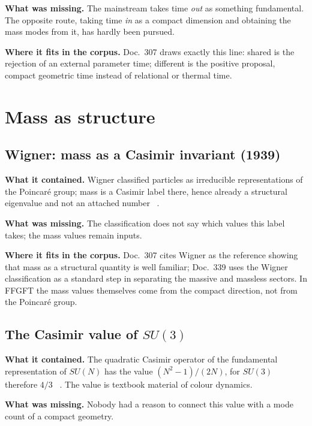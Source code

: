 \textbf{What was missing.} The mainstream takes time \emph{out} as something fundamental. The
opposite route, taking time \emph{in} as a compact dimension and obtaining the mass modes from it,
has hardly been pursued.

\textbf{Where it fits in the corpus.} Doc.~307 draws exactly this line: shared is the rejection of an
external parameter time; different is the positive proposal, compact geometric time instead of
relational or thermal time.

\section{Mass as structure}

\subsection{Wigner: mass as a Casimir invariant (1939)}

\textbf{What it contained.} Wigner classified particles as irreducible representations of the
Poincaré group; mass is a Casimir label there, hence already a structural eigenvalue and not an
attached number \EM~\cite{Wigner1939}.

\textbf{What was missing.} The classification does not say which values this label takes; the mass
values remain inputs.

\textbf{Where it fits in the corpus.} Doc.~307 cites Wigner as the reference showing that mass as a
structural quantity is well familiar; Doc.~339 uses the Wigner classification as a standard step in
separating the massive and massless sectors. In FFGFT the mass values themselves come from the
compact direction, not from the Poincaré group.

\subsection{The Casimir value of $SU(3)$}

\textbf{What it contained.} The quadratic Casimir operator of the fundamental representation of
$SU(N)$ has the value $(N^2-1)/(2N)$, for $SU(3)$ therefore $4/3$ \EM~\cite{Georgi1999}. The value is
textbook material of colour dynamics.

\textbf{What was missing.} Nobody had a reason to connect this value with a mode count of a compact
geometry.

